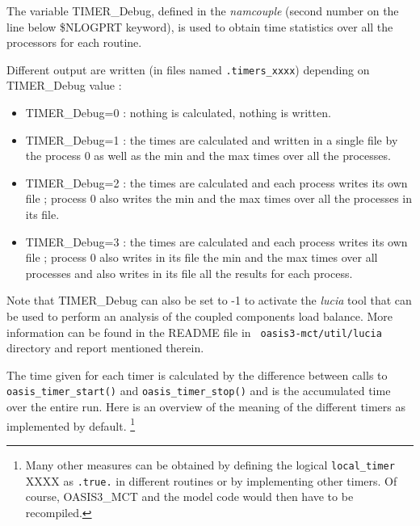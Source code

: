 The variable TIMER\_Debug, defined in the {\it namcouple} (second
number on the line below \$NLOGPRT keyword), is used to obtain time
statistics over all the processors for each routine.

Different output are written (in files named {\tt *.timers\_xxxx})
depending on TIMER\_Debug value :

\begin{itemize}
\item {TIMER\_Debug=0} : nothing is calculated, nothing is written.
\item {TIMER\_Debug=1} : the times are calculated and written in a
  single file by the process 0 as well as the min and the max times
  over all the processes.
\item {TIMER\_Debug=2} : the times are calculated and each process
  writes its own file ; process 0 also writes the min and the max
  times over all the processes in its file.
\item {TIMER\_Debug=3} : the times are calculated and each process
  writes its own file ; process 0 also writes in its file the min
  and the max times over all processes and also writes in its file
  all the results for each process.
\end{itemize}

Note that TIMER\_Debug can also be set to -1 to activate the {\it lucia}
tool that can be used to perform an analysis of the coupled components
load balance. More information can be found in the README file in {\tt
  oasis3-mct/util/lucia} directory and report mentioned therein.
 
The time given for each timer is calculated by the difference between
calls to {\tt oasis\_timer\_start()} and {\tt oasis\_timer\_stop()}
and is the accumulated time over the entire run. Here is an overview
of the meaning of the different timers as implemented by default.
\footnote{Many other measures can be obtained by defining the logical
{\tt local\_timer} XXXX as {\tt .true.} in different routines or by
implementing other timers. Of course, OASIS3\_MCT and the model code
would then have to be recompiled.}

